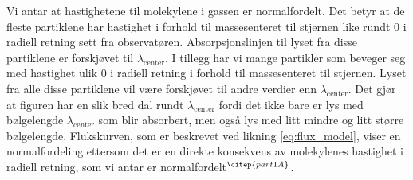 \documentclass[reprint, english,notitlepage]{revtex4-1}  %
\begin{document}
Vi antar at hastighetene til molekylene i gassen er normalfordelt. Det betyr at de fleste partiklene har hastighet i forhold til massesenteret til stjernen like rundt 0 i radiell retning sett fra observatøren. Absorpsjonslinjen til lyset fra disse partiklene er forskjøvet til $\lambda_{\text{center}}$. I tillegg har vi mange partikler som beveger seg med hastighet ulik 0 i radiell retning i forhold til massesenteret til stjernen. Lyset fra alle disse partiklene vil være forskjøvet til andre verdier enn $\lambda_{\text{center}}$. Det gjør at figuren har en slik bred dal rundt $\lambda_{\text{center}}$ fordi det ikke bare er lys med bølgelengde $\lambda_{\text{center}}$ som blir absorbert, men også lys med litt mindre og litt større bølgelengde. Flukskurven, som er beskrevet ved likning \ref{eq:flux_model}, viser en normalfordeling ettersom det er en direkte konsekvens av molekylenes hastighet i radiell retning, som vi antar er normalfordelt$^{\citep{part1A}}$.
\end{document}
